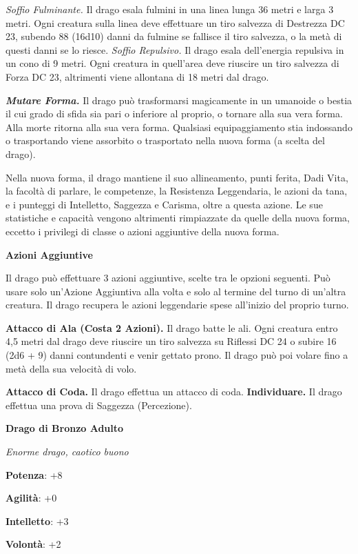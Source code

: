 \begin{multicols}{2}
\emph{Soffio Fulminante.} Il drago esala fulmini in una linea lunga 36
metri e larga 3 metri. Ogni creatura sulla linea deve effettuare un tiro
salvezza di Destrezza DC 23, subendo 88 (16d10) danni da fulmine se
fallisce il tiro salvezza, o la metà di questi danni se lo riesce.
\emph{Soffio Repulsivo.} Il drago esala dell'energia repulsiva in un
cono di 9 metri. Ogni creatura in quell'area deve riuscire un tiro
salvezza di Forza DC 23, altrimenti viene allontana di 18 metri dal
drago.

\emph{\textbf{Mutare Forma.}} Il drago può trasformarsi magicamente in
un umanoide o bestia il cui grado di sfida sia pari o inferiore al
proprio, o tornare alla sua vera forma. Alla morte ritorna alla sua vera
forma. Qualsiasi equipaggiamento stia indossando o trasportando viene
assorbito o trasportato nella nuova forma (a scelta del drago).

Nella nuova forma, il drago mantiene il suo allineamento, punti ferita,
Dadi Vita, la facoltà di parlare, le competenze, la Resistenza
Leggendaria, le azioni da tana, e i punteggi di Intelletto, Saggezza e
Carisma, oltre a questa azione. Le sue statistiche e capacità vengono
altrimenti rimpiazzate da quelle della nuova forma, eccetto i privilegi
di classe o azioni aggiuntive della nuova forma.

\textbf{Azioni Aggiuntive}

Il drago può effettuare 3 azioni aggiuntive, scelte tra le opzioni
seguenti. Può usare solo un'Azione Aggiuntiva alla volta e solo al
termine del turno di un'altra creatura. Il drago recupera le azioni
leggendarie spese all'inizio del proprio turno.

\textbf{Attacco di Ala (Costa 2 Azioni).} Il drago batte le ali. Ogni
creatura entro 4,5 metri dal drago deve riuscire un tiro salvezza su Riflessi DC 24 o subire 16 (2d6 + 9) danni contundenti e venir gettato
prono. Il drago può poi volare fino a metà della sua velocità di volo.

\textbf{Attacco di Coda.} Il drago effettua un attacco di coda.
\textbf{Individuare.} Il drago effettua una prova di Saggezza
(Percezione).

\textbf{Drago di Bronzo Adulto}

\emph{Enorme drago, caotico buono}

\textbf{Potenza}: +8

\textbf{Agilità}: +0

\textbf{Intelletto}: +3

\textbf{Volontà}: +2


\end{multicols}
